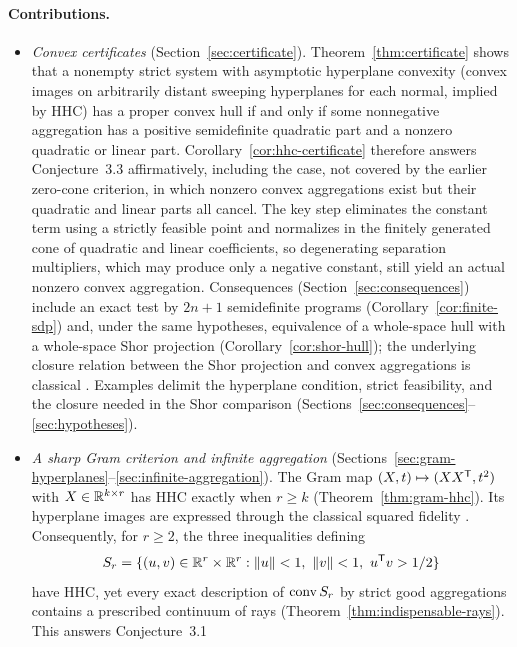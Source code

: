 \paragraph{Contributions.}
\begin{itemize}
\item \emph{Convex certificates} (Section~\ref{sec:certificate}).
  Theorem~\ref{thm:certificate} shows that a nonempty strict system
  with asymptotic hyperplane convexity (convex images on arbitrarily
  distant sweeping hyperplanes for each normal, implied by HHC) has a
  proper convex hull if and only if some nonnegative aggregation has a
  positive semidefinite quadratic part and a nonzero quadratic or linear
  part. Corollary~\ref{cor:hhc-certificate} therefore
  answers Conjecture~3.3 affirmatively, including the case, not covered
  by the earlier zero-cone criterion, in which nonzero convex
  aggregations exist but their quadratic and linear parts all cancel. The
  key step eliminates the constant term using a strictly feasible point
  and normalizes in the finitely generated cone of quadratic and linear
  coefficients, so degenerating separation multipliers, which may produce
  only a negative constant, still yield an actual nonzero convex
  aggregation.
  Consequences (Section~\ref{sec:consequences}) include an exact test by
  $2n+1$ semidefinite programs (Corollary~\ref{cor:finite-sdp}) and, under
  the same hypotheses, equivalence of a whole-space hull with a
  whole-space Shor projection (Corollary~\ref{cor:shor-hull}); the
  underlying closure relation between the Shor projection and convex
  aggregations is classical \citep{FujieKojima1997,KojimaTuncel2000}.
  Examples delimit the hyperplane condition, strict feasibility, and the
  closure needed in the Shor comparison
  (Sections~\ref{sec:consequences}--\ref{sec:hypotheses}).
\item \emph{A sharp Gram criterion and infinite aggregation}
  (Sections~\ref{sec:gram-hyperplanes}--\ref{sec:infinite-aggregation}).
  The Gram map $(X,t)\mapsto(XX^{\mathsf T},t^2)$ with
  $X\in\mathbb R^{k\times r}$ has HHC exactly when $r\geq k$
  (Theorem~\ref{thm:gram-hhc}). Its hyperplane images are expressed
  through the classical squared fidelity \citep{Uhlmann2000}.
  Consequently, for $r\geq2$, the three inequalities defining
  \[
   S_r=\{(u,v)\in\mathbb R^r\times\mathbb R^r:
           \|u\|<1,\ \|v\|<1,\ u^{\mathsf T} v>1/2\}
  \]
  have HHC, yet every exact description of $\operatorname{conv} S_r$ by
  strict good aggregations contains a prescribed continuum of rays
  (Theorem~\ref{thm:indispensable-rays}). This answers Conjecture~3.1

\end{itemize}
